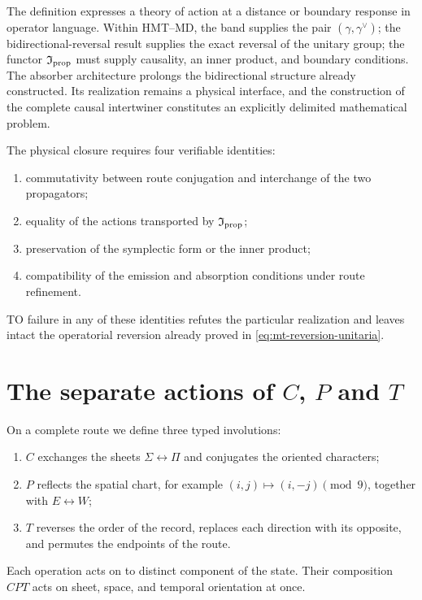 The definition expresses a theory of action at a distance or boundary response in operator language. Within HMT--MD, the band supplies the pair $(\gamma,\gamma^\vee)$; the bidirectional-reversal result supplies the exact reversal of the unitary group; the functor $\mathfrak I_{\rm prop}$ must supply causality, an inner product, and boundary conditions. The absorber architecture prolongs the bidirectional structure already constructed. Its realization remains a physical interface, and the construction of the complete causal intertwiner constitutes an explicitly delimited mathematical problem.

The physical closure requires four verifiable identities:
\begin{enumerate}
 \item commutativity between route conjugation and interchange of the two
 propagators;
 \item equality of the actions transported by
 $\mathfrak I_{\rm prop}$;
 \item preservation of the symplectic form or the inner product;
 \item compatibility of the emission and absorption conditions under
 route refinement.
\end{enumerate}
TO failure in any of these identities refutes the particular realization
and leaves intact the operatorial reversion already proved in
\eqref{eq:mt-reversion-unitaria}.

\section{The separate actions of \texorpdfstring{$C$}{C},
\texorpdfstring{$P$}{P} and \texorpdfstring{$T$}{T}}

On a complete route we define three typed involutions:
\begin{enumerate}
 \item $C$ exchanges the sheets $\Sigma\leftrightarrow\Pi$ and conjugates the
 oriented characters;
 \item $P$ reflects the spatial chart, for example
 $(i,j)\mapsto(i,-j)\pmod9$, together with
 $E\leftrightarrow W$;
 \item $T$ reverses the order of the record, replaces each direction with its
 opposite, and permutes the endpoints of the route.
\end{enumerate}
Each operation acts on to distinct component of the state. Their composition
$CPT$ acts on sheet, space, and temporal orientation at once.

